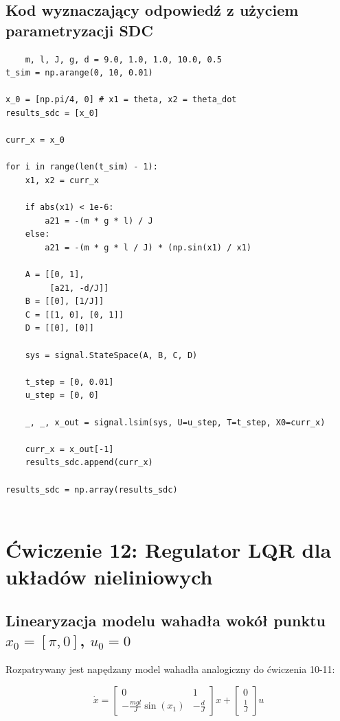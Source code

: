 \documentclass[11pt]{article}
\begin{document}
\newpage

\subsection{Kod wyznaczający odpowiedź z użyciem parametryzacji SDC}

\begin{lstlisting}
    m, l, J, g, d = 9.0, 1.0, 1.0, 10.0, 0.5
t_sim = np.arange(0, 10, 0.01)

x_0 = [np.pi/4, 0] # x1 = theta, x2 = theta_dot
results_sdc = [x_0]

curr_x = x_0

for i in range(len(t_sim) - 1):
    x1, x2 = curr_x
    
    if abs(x1) < 1e-6:
        a21 = -(m * g * l) / J
    else:
        a21 = -(m * g * l / J) * (np.sin(x1) / x1)
    
    A = [[0, 1],
         [a21, -d/J]]
    B = [[0], [1/J]]
    C = [[1, 0], [0, 1]]
    D = [[0], [0]]
    
    sys = signal.StateSpace(A, B, C, D)
    
    t_step = [0, 0.01]
    u_step = [0, 0] 
    
    _, _, x_out = signal.lsim(sys, U=u_step, T=t_step, X0=curr_x)
    
    curr_x = x_out[-1]
    results_sdc.append(curr_x)

results_sdc = np.array(results_sdc)
    
\end{lstlisting}


\section{Ćwiczenie 12: Regulator LQR dla układów nieliniowych}

\subsection{Linearyzacja modelu wahadła wokół punktu $x_0 = [\pi, 0]$, $u_0 = 0$ }

Rozpatrywany jest napędzany model wahadła analogiczny do ćwiczenia 10-11:

\[
\dot{x}=\begin{bmatrix}
    0 & 1 \\
    -\frac{mgl}{J}\sin(x_1) & -\frac{d}{J}
\end{bmatrix}x + \begin{bmatrix}
    0 \\ \frac{1}{J}
\end{bmatrix}u
\]
\end{document}
